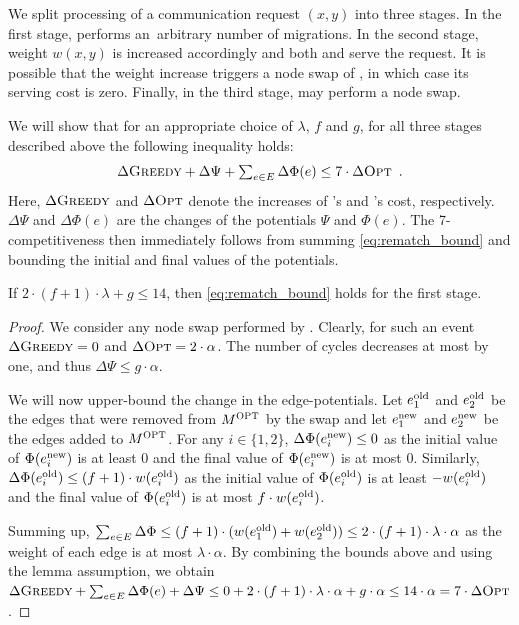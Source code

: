 We split processing of a communication request $(x,y)$ into three stages. In
the first stage, \OPT performs an~arbitrary number of migrations. In the
second stage, weight $w(x,y)$ is increased accordingly and both \OPT and
\GREEDY serve the request. It is possible that the weight increase triggers a
node swap of \GREEDY, in which case its serving cost is zero. Finally, in the
third stage, \GREEDY may perform a node swap.

We will show that for an appropriate choice of $\lambda$, $f$ and $g$, for all
three stages described above the following inequality holds:
\begin{equation}
\label{eq:rematch_bound}
	\textstyle \Delta \textsc{Greedy} + \Delta \Psi + \sum_{e \in E} \Delta \Phi(e) \leq 7 \cdot \Delta \textsc{Opt} \enspace.
\end{equation}
Here, $\Delta \textsc{Greedy}$ and $\Delta \textsc{Opt}$ denote the increases of \GREEDY's and
\OPT's cost, respectively. $\Delta \Psi$ and $\Delta \Phi(e)$ are the changes
of the potentials $\Psi$ and $\Phi(e)$. The 7-competitiveness then immediately
follows from summing \eqref{eq:rematch_bound} and bounding the initial and
final values of the potentials. 

\begin{lemma}
\label{lem:opt_swap}
If $2 \cdot (f+1) \cdot \lambda + g \leq 14$, then \eqref{eq:rematch_bound}
holds for the first stage.
\end{lemma}

\begin{proof}
We consider any node swap performed by \OPT. Clearly, for such an event
$\Delta \textsc{Greedy} = 0$ and $\Delta \textsc{Opt} = 2 \cdot \alpha$. The number of cycles
decreases at most by one, and thus $\Delta \Psi \leq g \cdot \alpha$.

We will now upper-bound the change in the edge-potentials. Let $e^\textrm{old}_1$ and
$e^\textrm{old}_2$ be the edges that were removed from $M^\textsc{OPT}$ by the swap and let
$e^\textrm{new}_1$ and $e^\textrm{new}_2$ be the edges added to $M^\textsc{OPT}$. For any $i \in
\{1,2\}$, $\Delta \Phi(e^\textrm{new}_i) \leq 0$ as the initial value of
$\Phi(e^\textrm{new}_i)$ is at least $0$ and the final value of $\Phi(e^\textrm{new}_i)$ is at
most $0$. Similarly, $\Delta \Phi(e^\textrm{old}_i) \leq (f+1) \cdot w(e^\textrm{old}_i)$ as the
initial value of $\Phi(e^\textrm{old}_i)$ is at least $-w(e^\textrm{old}_i)$ and the final value
of $\Phi(e^\textrm{old}_i)$ is at most $f \cdot w(e^\textrm{old}_i)$.

Summing up, $\sum_{e \in E} \Delta \Phi \leq (f+1) \cdot (w(e^\textrm{old}_1) +
w(e^\textrm{old}_2)) \leq 2 \cdot (f+1) \cdot \lambda \cdot \alpha$ as the weight of each edge
is at most $\lambda \cdot \alpha$. By combining the bounds above and using the
lemma assumption, we obtain $\Delta \textsc{Greedy} + \sum_{e \in E} \Delta \Phi(e) +
\Delta \Psi \leq 0 + 2 \cdot (f+1) \cdot \lambda \cdot \alpha + g \cdot \alpha 
\leq 14 \cdot \alpha = 7 \cdot \Delta \textsc{Opt}$.
\end{proof}


